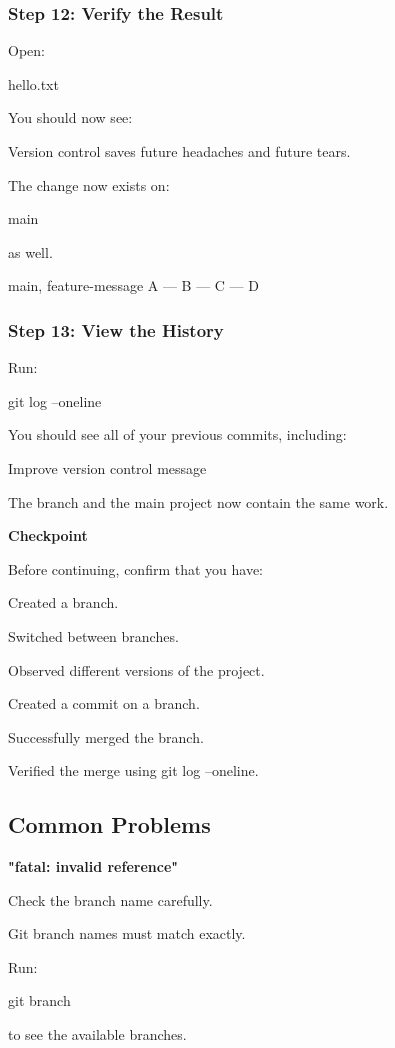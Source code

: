\documentclass{csc2059practical}
\begin{document}
\subsubsection{Step 12: Verify the Result}
Open:

\begin{terminalplain}
hello.txt
\end{terminalplain}
You should now see:

\begin{terminalplain}
Version control saves future headaches and future tears.
\end{terminalplain}
The change now exists on:

main

as well.

main, feature-message A --- B --- C --- D

\subsubsection{Step 13: View the History}
Run:

\begin{terminalplain}
git log --oneline
\end{terminalplain}
You should see all of your previous commits, including:

Improve version control message

The branch and the main project now contain the same work.

\begin{reflectionbox}
\textbf{Checkpoint}\par
\medskip

Before continuing, confirm that you have:


Created a branch.


Switched between branches.


Observed different versions of the project.


Created a commit on a branch.


Successfully merged the branch.


Verified the merge using git log --oneline.


\end{reflectionbox}
\subsection{Common Problems}
\begin{commonerror}
\textbf{"fatal: invalid reference"}\par
\medskip

Check the branch name carefully.


Git branch names must match exactly.


Run:


\end{commonerror}
\begin{terminalplain}
git branch
\end{terminalplain}
to see the available branches.
\end{document}
